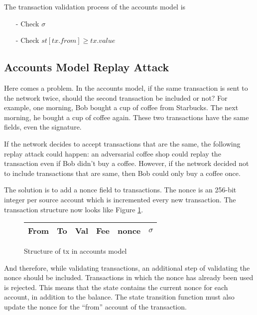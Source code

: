The transaction validation process of the accounts model is
\begin{itemize}
    \item[-] Check $\sigma$
    \item[-] Check $st [tx.from] \geq tx.value$
\end{itemize}

\subsection{Accounts Model Replay Attack}

Here comes a problem. In the accounts model, if the same transaction is sent to the network twice, should the second transaction be included or not? For example, one morning, Bob bought a cup of coffee from Starbucks. The next morning, he bought a cup of coffee again. These two transactions have the same fields, even the signature.

If the network decides to accept transactions that are the same, the following replay attack could happen: an adversarial coffee shop could replay the transaction even if Bob didn't buy a coffee. However, if the network decided not to include transactions that are same, then Bob could only buy a coffee once.

The solution is to add a nonce field to transactions. The nonce is an 256-bit integer per source account which is incremented every new transaction. The transaction structure now looks like Figure \ref{fig:accountsTxWithNonce}.

\begin{figure}[ht]
\centering
    \begin{tabular}{|c|c|c|c|c|c|}
         \hline
         From & To & Val & Fee & \textbf{nonce} & {$\sigma$} \\
         \hline
    \end{tabular}
    \caption{Structure of tx in accounts model}
    \label{fig:accountsTxWithNonce}
\end{figure}

And therefore, while validating transactions, an additional step of validating the nonce should be included. Transactions in which the nonce
has already been used is rejected.
This means that the state contains the current nonce for each account, in addition to the balance.
The state transition function must also update the nonce for the ``from'' account of the transaction.

